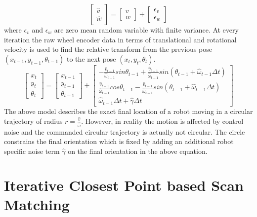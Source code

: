 \begin{equation}
\begin{bmatrix}
\hat{v} \\ \hat{w} 
\end{bmatrix} = 
\begin{bmatrix}
v \\ w
\end{bmatrix} + 
\begin{bmatrix}
\epsilon_v \\ \epsilon_w
\end{bmatrix}
\end{equation}
where $\epsilon_v$ and $\epsilon_w$ are zero mean random variable with finite variance. At every iteration the raw wheel encoder data in terms of translational and rotational velocity is used to find the relative transform from the previous pose $(x_{t-1}, y_{t-1}, \theta_{t-1})$ to the next pose $(x_{t}, y_{t}, \theta_{t})$. 
\begin{equation}
\begin{bmatrix}
x_t \\ y_t \\ \theta_t
\end{bmatrix} = 
\begin{bmatrix}
x_{t-1} \\ 
y_{t-1} \\
\theta_{t-1}
\end{bmatrix} + 
\begin{bmatrix}
-\frac{\hat{v}_{t-1}}{\hat{\omega}_{t-1}}sin \theta_{t-1} + \frac{\hat{v}_{t-1}}{\hat{\omega}_{t-1}}sin(\theta_{t-1} + \hat{\omega}_{t-1} \Delta t) \\ 
\frac{\hat{v}_{t-1}}{\hat{\omega}_{t-1}}cos \theta_{t-1} - \frac{\hat{v}_{t-1}}{\hat{\omega}_{t-1}}sin(\theta_{t-1} + \hat{\omega}_{t-1} \Delta t) \\ 
\hat{\omega}_{t-1} \Delta t + \hat{\gamma}\Delta t
\end{bmatrix}
\end{equation}
The above model describes the exact final location of a robot moving in a circular trajectory of radius $r = \frac{\hat{v}}{\hat{\omega}}$. However, in reality the motion is affected by control noise and the commanded circular trajectory is actually not circular. The circle constrains the final orientation which is fixed by adding an additional robot specific noise term $\hat{\gamma}$ on the final orientation in the above equation. 

\section{Iterative Closest Point based Scan Matching}


